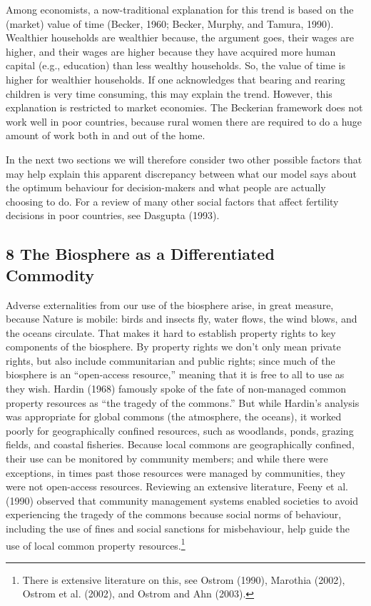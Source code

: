 \documentclass[man,11pt,a4paper,floatsintext]{apa7}
\begin{document}
Among economists, a now-traditional explanation for this trend is based on the (market) value of time (Becker, 1960; Becker, Murphy, and Tamura, 1990). Wealthier households are wealthier because, the argument goes, their wages are higher, and their wages are higher because they have acquired more human capital (e.g., education) than less wealthy households. So, the value of time is higher for wealthier households. If one acknowledges that bearing and rearing children is very time consuming, this may explain the trend. However, this explanation is restricted to market economies. The Beckerian framework does not work well in poor countries, because rural women there are required to do a huge amount of work both in and out of the home.

In the next two sections we will therefore consider two other possible factors that may help explain this apparent discrepancy between what our model says about the optimum behaviour for decision-makers and what people are actually choosing to do. For a review of many other social factors that affect fertility decisions in poor countries, see Dasgupta (1993).

\subsection{8 The Biosphere as a Differentiated Commodity}

Adverse externalities from our use of the biosphere arise, in great measure, because Nature is mobile: birds and insects fly, water flows, the wind blows, and the oceans circulate. That makes it hard to establish property rights to key components of the biosphere. By property rights we don't only mean private rights, but also include communitarian and public rights; since much of the biosphere is an ``open-access resource,'' meaning that it is free to all to use as they wish. Hardin (1968) famously spoke of the fate of non-managed common property resources as ``the tragedy of the commons.'' But while Hardin's analysis was appropriate for global commons (the atmosphere, the oceans), it worked poorly for geographically confined resources, such as woodlands, ponds, grazing fields, and coastal fisheries. Because local commons are geographically confined, their use can be monitored by community members; and while there were exceptions, in times past those resources were managed by communities, they were not open-access resources. Reviewing an extensive literature, Feeny et al. (1990) observed that community management systems enabled societies to avoid experiencing the tragedy of the commons because social norms of behaviour, including the use of fines and social sanctions for misbehaviour, help guide the use of local common property resources.\footnote{There is extensive literature on this, see Ostrom (1990), Marothia (2002), Ostrom et al. (2002), and Ostrom and Ahn (2003).}
\end{document}
